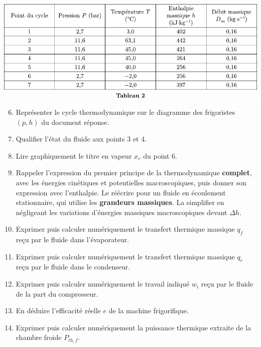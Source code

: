 \documentclass[a4paper, 12pt, garamond]{book}
\begin{document}
\begin{center}

	\includegraphics[scale=1]{figures/pb-chambre-tab2.pdf}

\end{center}

\begin{enumerate}
	\setcounter{enumi}{5}
	\item
	      Représenter le cycle thermodynamique sur le diagramme des frigoristes
	      \((p,h)\) du document réponse.
	\item
	      Qualifier l'état du fluide aux points 3 et 4.
	\item
	      Lire graphiquement le titre en vapeur \(x_v\) du point 6.
	\item
	      Rappeler l'expression du premier principe de la thermodynamique
	      \textbf{complet}, avec les énergies cinétiques et potentielles
	      macroscopiques, puis donner son expression avec l'enthalpie.
	      \smallbreak
	      Le réécrire pour un fluide en écoulement stationnaire, qui utilise les
	      \textbf{grandeurs massiques}. La simplifier en négligeant les variations
	      d'énergies massiques macroscopiques devant $\Delta{h}$.
	\item
	      Exprimer puis calculer numériquement le transfert thermique massique
	      \(q_f\) reçu par le fluide dans l'évaporateur.
	\item
	      Exprimer puis calculer numériquement le transfert thermique massique
	      \(q_c\) reçu par le fluide dans le condenseur.
	\item
	      Exprimer puis calculer numériquement le travail indiqué \(w_i\) reçu
	      par le fluide de la part du compresseur.
	\item
	      En déduire l'efficacité réelle \(e\) de la machine frigorifique.
	\item
	      Exprimer puis calculer numériquement la puissance thermique extraite
	      de la chambre froide \(P_{th,f}\).
\end{enumerate}
\end{document}
